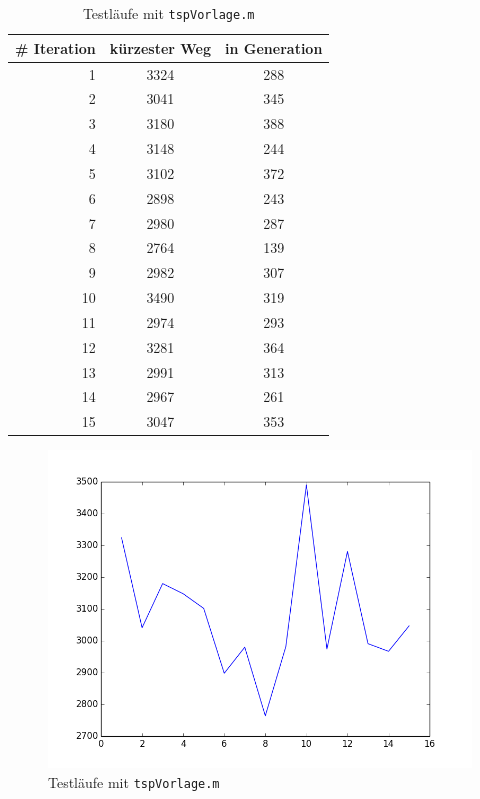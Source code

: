 \begin{table}[h]
\begin{tabular}{ | r | c | c | }
  \hline
  \# Iteration & kürzester Weg & in Generation \\
  \hline
  1  & 3324 & 288 \\
  2  & 3041 & 345 \\
  3  & 3180 & 388 \\
  4  & 3148 & 244 \\
  5  & 3102 & 372 \\
  6  & 2898 & 243 \\
  7  & 2980 & 287 \\
  8  & 2764 & 139 \\
  9  & 2982 & 307 \\
  10 & 3490 & 319 \\
  11 & 2974 & 293 \\
  12 & 3281 & 364 \\
  13 & 2991 & 313 \\
  14 & 2967 & 261 \\
  15 & 3047 & 353 \\
  \hline
\end{tabular}
\caption{Testläufe mit {\tt tspVorlage.m}}\label{testlaeufe}
\end{table}

\begin{figure}[h!]
  \centering
  \includegraphics[width=1.0\textwidth]{Figures/tspVorlage.png}
  \caption{Testläufe mit {\tt tspVorlage.m}}\label{fig.testlaeufe}
\end{figure}


